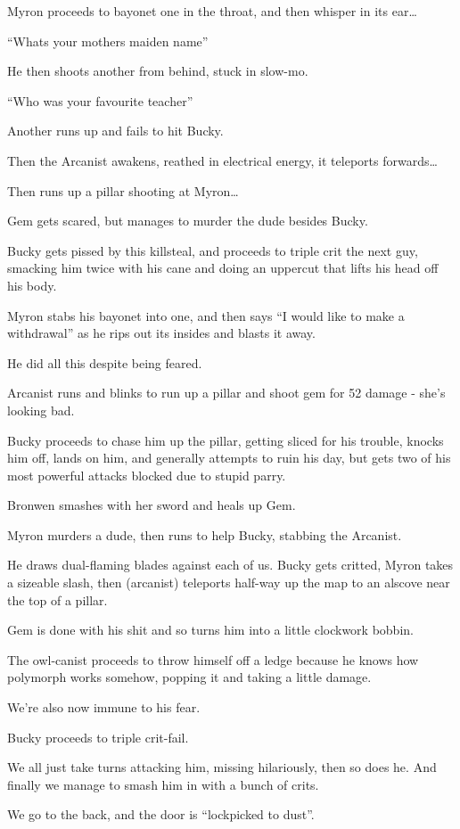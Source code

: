 Myron proceeds to bayonet one in the throat, and then whisper in its ear…\medskip

“Whats your mothers maiden name”\medskip

He then shoots another from behind, stuck in slow-mo.\medskip

“Who was your favourite teacher”\medskip

Another runs up and fails to hit Bucky.\medskip

Then the Arcanist awakens, reathed in electrical energy, it teleports forwards…\medskip

Then runs up a pillar shooting at Myron…\medskip

Gem gets scared, but manages to murder the dude besides Bucky.\medskip

Bucky gets pissed by this killsteal, and proceeds to triple crit the next guy, smacking him twice with his cane and doing an uppercut that lifts his head off his body.\medskip

Myron stabs his bayonet into one, and then says “I would like to make a withdrawal” as he rips out its insides and blasts it away.\medskip

He did all this despite being feared.\medskip

Arcanist runs and blinks to run up a pillar and shoot gem for 52 damage - she’s looking bad.\medskip

Bucky proceeds to chase him up the pillar, getting sliced for his trouble, knocks him off, lands on him, and generally attempts to ruin his day, but gets two of his most powerful attacks blocked due to stupid parry.\medskip

Bronwen smashes with her sword and heals up Gem.\medskip

Myron murders a dude, then runs to help Bucky, stabbing the Arcanist.\medskip

He draws dual-flaming blades against each of us. Bucky gets critted, Myron takes a sizeable slash, then (arcanist) teleports half-way up the map to an alscove near the top of a pillar.\medskip

Gem is done with his shit and so turns him into a little clockwork bobbin.\medskip

The owl-canist proceeds to throw himself off a ledge because he knows how polymorph works somehow, popping it and taking a little damage.\medskip

We’re also now immune to his fear.\medskip

Bucky proceeds to triple crit-fail.\medskip

We all just take turns attacking him, missing hilariously, then so does he. And finally we manage to smash him in with a bunch of crits.\medskip

We go to the back, and the door is “lockpicked to dust”.\medskip

\vspace*{5mm}
